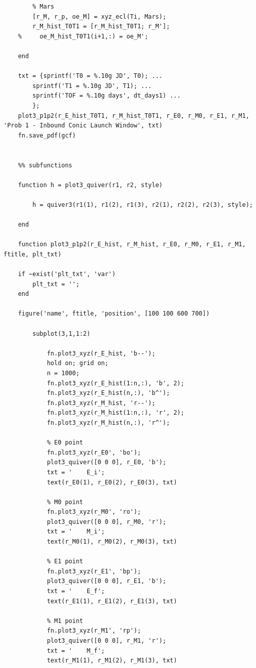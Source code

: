 \documentclass[conf]{new-aiaa}
\begin{document}
\begin{lstlisting}
        % Mars 
        [r_M, r_p, oe_M] = xyz_ecl(Ti, Mars); 
        r_M_hist_T0T1 = [r_M_hist_T0T1; r_M']; 
    %     oe_M_hist_T0T1(i+1,:) = oe_M'; 
        
    end 
    
    txt = {sprintf('T0 = %.10g JD', T0); ... 
        sprintf('T1 = %.10g JD', T1); ... 
        sprintf('TOF = %.10g days', dt_days1) ... 
        }; 
    plot3_p1p2(r_E_hist_T0T1, r_M_hist_T0T1, r_E0, r_M0, r_E1, r_M1, 'Prob 1 - Inbound Conic Launch Window', txt)
    fn.save_pdf(gcf)
    
    
    %% subfunctions 
    
    function h = plot3_quiver(r1, r2, style)
    
        h = quiver3(r1(1), r1(2), r1(3), r2(1), r2(2), r2(3), style); 
    
    end 
    
    function plot3_p1p2(r_E_hist, r_M_hist, r_E0, r_M0, r_E1, r_M1, ftitle, plt_txt)
    
    if ~exist('plt_txt', 'var')
        plt_txt = ''; 
    end 
    
    figure('name', ftitle, 'position', [100 100 600 700])
    
        subplot(3,1,1:2)
    
            fn.plot3_xyz(r_E_hist, 'b--'); 
            hold on; grid on; 
            n = 1000; 
            fn.plot3_xyz(r_E_hist(1:n,:), 'b', 2); 
            fn.plot3_xyz(r_E_hist(n,:), 'b^'); 
            fn.plot3_xyz(r_M_hist, 'r--'); 
            fn.plot3_xyz(r_M_hist(1:n,:), 'r', 2); 
            fn.plot3_xyz(r_M_hist(n,:), 'r^'); 
    
            % E0 point 
            fn.plot3_xyz(r_E0', 'bo'); 
            plot3_quiver([0 0 0], r_E0, 'b'); 
            txt = '    E_i'; 
            text(r_E0(1), r_E0(2), r_E0(3), txt)
    
            % M0 point 
            fn.plot3_xyz(r_M0', 'ro'); 
            plot3_quiver([0 0 0], r_M0, 'r'); 
            txt = '    M_i'; 
            text(r_M0(1), r_M0(2), r_M0(3), txt)
    
            % E1 point 
            fn.plot3_xyz(r_E1', 'bp'); 
            plot3_quiver([0 0 0], r_E1, 'b'); 
            txt = '    E_f'; 
            text(r_E1(1), r_E1(2), r_E1(3), txt)
    
            % M1 point 
            fn.plot3_xyz(r_M1', 'rp'); 
            plot3_quiver([0 0 0], r_M1, 'r'); 
            txt = '    M_f'; 
            text(r_M1(1), r_M1(2), r_M1(3), txt)
    

\end{lstlisting}
\end{document}
